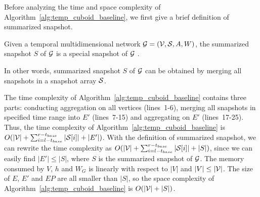 \documentclass[10pt,journal,compsoc]{IEEEtran}
\begin{document}



Before analyzing the time and space complexity of Algorithm~\ref{alg:temp_cuboid_baseline}, we first give a brief definition of summarized snapshot.
\begin{definition}
	\label{def:sum_snap}
	Given a temporal multidimensional network $\mathcal{G}=(\mathcal{V},\mathcal{S},A,W)$, the summarized snapshot $ S $ of $ \mathcal{G} $ is a special snapshot of $ \mathcal{G} $ .
\end{definition}
In other words, summarized snapshot $ S $ of $ \mathcal{G} $ can be obtained by merging all snapshots in a snapshot array $ \mathcal{S} $.

The time complexity of Algorithm~\ref{alg:temp_cuboid_baseline} contains three parts: conducting aggregation on all vertices (lines~1-6), merging all snapshots in specified time range into $ E' $ (lines~7-15) and aggregating on $ E' $ (lines~17-25). Thus, the time complexity of Algorithm~\ref{alg:temp_cuboid_baseline} is $ O(|\mathcal{V}|+\sum_{i=l-t_{base}}^{r-t_{base}}|\mathcal{S}[i]|+|E'|) $. With the definition of summarized snapshot, we can rewrite the time complexity as $ O(|\mathcal{V}|+\sum_{i=l-t_{base}}^{r-t_{base}}|\mathcal{S}[i]|+|S|) $, since we can easily find $ |E'| \leq |S|$, where $ S $ is the summarized snapshot of $ \mathcal{G} $. The memory consumed by $V$, $h$ and $W_{G}$ is linearly with respect to $ |V| $ and $ |V| \leq |\mathcal{V}| $. The size of $ E $, $ E' $ and $ EP $ are all smaller than $ |S| $, so the space complexity of Algorithm~\ref{alg:temp_cuboid_baseline} is $ O(|\mathcal{V}|+|S|) $.
\end{document}
